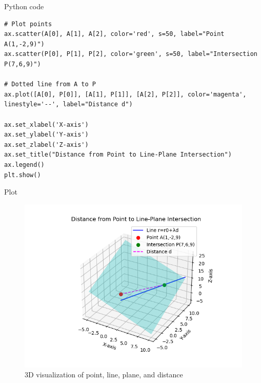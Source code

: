 \documentclass{beamer}
\begin{document}
    \begin{frame}[fragile]{Python code}
    \begin{lstlisting}
# Plot points
ax.scatter(A[0], A[1], A[2], color='red', s=50, label="Point A(1,-2,9)")
ax.scatter(P[0], P[1], P[2], color='green', s=50, label="Intersection P(7,6,9)")

# Dotted line from A to P
ax.plot([A[0], P[0]], [A[1], P[1]], [A[2], P[2]], color='magenta', linestyle='--', label="Distance d")

ax.set_xlabel('X-axis')
ax.set_ylabel('Y-axis')
ax.set_zlabel('Z-axis')
ax.set_title("Distance from Point to Line-Plane Intersection")
ax.legend()
plt.show()
	\end{lstlisting}
	\end{frame}
	
	
	\begin{frame}{Plot}
	    \begin{figure}[H]
	        \centering
	        \includegraphics[width=0.7\columnwidth]{figs/Figure_1.png}
	        \caption{3D visualization of point, line, plane, and distance}
	    \end{figure}
	\end{frame}
	
\end{document}
